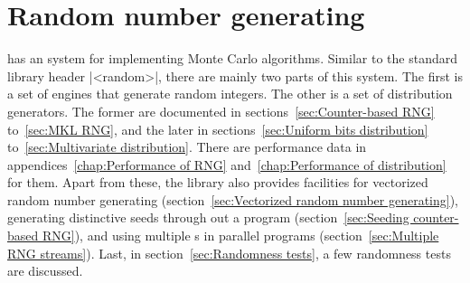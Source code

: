 %
%
%
%

\chapter{Random number generating}
\label{chap:Random number generating}

\mckl has an \rng system for implementing Monte Carlo algorithms. Similar to
the standard library header |<random>|, there are mainly two parts of this
system. The first is a set of \rng engines that generate random integers. The
other is a set of distribution generators. The former are documented in
sections~\ref{sec:Counter-based RNG} to~\ref{sec:MKL RNG}, and the later in
sections~\ref{sec:Uniform bits distribution} to~\ref{sec:Multivariate
  distribution}. There are performance data in appendices~\ref{chap:Performance
of RNG} and~\ref{chap:Performance of distribution} for them. Apart from these,
the library also provides facilities for vectorized random number generating
(section~\ref{sec:Vectorized random number generating}), generating distinctive
seeds through out a program (section~\ref{sec:Seeding counter-based RNG}), and
using multiple \rng{}s in parallel programs (section~\ref{sec:Multiple RNG
streams}). Last, in section~\ref{sec:Randomness tests}, a few randomness tests
are discussed.

